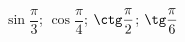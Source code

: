 \begin{ex}[type=calculate]
	\begin{condition}
		\( \sin\dfrac{\pi}{3} \); \( \cos\dfrac{\pi}{4} \); \( \ctg\dfrac{\pi}{2} \); \( \tg\dfrac{\pi}{6} \)
	\end{condition}
\end{ex}